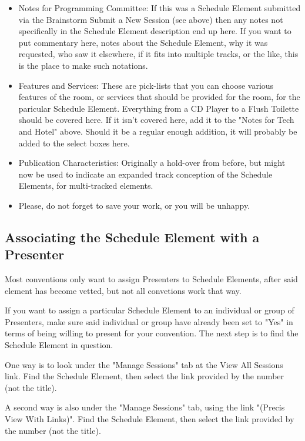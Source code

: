 \documentclass[captions=tablesignature]{scrartcl}
\begin{document}
\begin{itemize}
\item Notes for Programming Committee: If this was a Schedule Element
submitted via the Brainstorm Submit a New Session (see above) then
any notes not specifically in the Schedule Element description
end up here.  If you want to put commentary here, notes about the
Schedule Element, why it was requested, who saw it elsewhere, if
it fits into multiple tracks, or the like, this is the place to
make such notations.

\item Features and Services: These are pick-lists that you can choose
various features of the room, or services that should be provided
for the room, for the paricular Schedule Element.  Everything
from a CD Player to a Flush Toilette should be covered here.  If
it isn't covered here, add it to the "Notes for Tech and Hotel"
above. Should it be a regular enough addition, it will probably
be added to the select boxes here.

\item Publication Characteristics: Originally a hold-over from before,
but might now be used to indicate an expanded track conception of
the Schedule Elements, for multi-tracked elements.

\item Please, do not forget to save your work, or you will be unhappy.
\end{itemize}
\subsection{Associating the Schedule Element with a Presenter}
\label{sec-5-4}

Most conventions only want to assign Presenters to Schedule
Elements, after said element has become vetted, but not all
convetions work that way.

If you want to assign a particular Schedule Element to an
individual or group of Presenters, make sure said individual or
group have already been set to "Yes" in terms of being willing to
present for your convention.  The next step is to find the Schedule
Element in question.

One way is to look under the "Manage Sessions" tab at the View All
Sessions link.  Find the Schedule Element, then select the link
provided by the number (not the title).

A second way is also under the "Manage Sessions" tab, using the
link "(Precis View With Links)".  Find the Schedule Element, then
select the link provided by the number (not the title).
\end{document}
